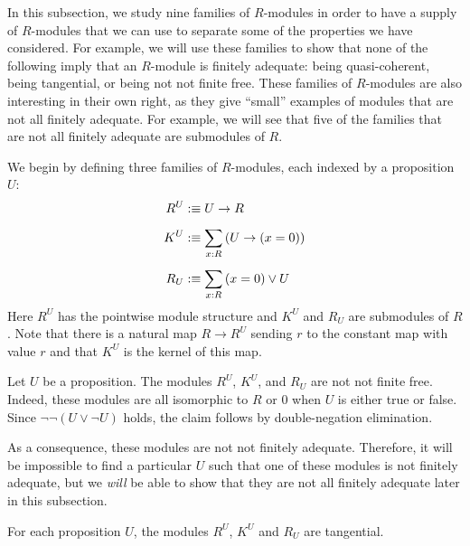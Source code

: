 In this subsection, we study nine families of $R$-modules in order to have a
supply of $R$-modules that we can use to separate some of the properties we have considered.
For example, we will use these families to show that none of the following imply that
an $R$-module is finitely adequate:
being quasi-coherent, being tangential, or being not not finite free.
These families of $R$-modules are also interesting in their own right,
as they give ``small'' examples of modules that are not all finitely adequate.
For example, we will see that five of the families that are not all
finitely adequate are submodules of $R$.

We begin by defining three families of $R$-modules, each indexed by a proposition $U$:
\begin{align*}
  R^U &:\equiv U \to R \\[5pt]
  K^U &:\equiv \sum_{x:R} \, (U \to (x = 0)) \\[5pt]
  R_U &:\equiv \sum_{x:R} \, (x = 0) \lor U
\end{align*}
Here $R^U$ has the pointwise module structure and $K^U$ and $R_U$ are submodules of $R$.
Note that there is a natural map $R \to R^U$ sending $r$ to the constant map with value $r$ and that $K^U$ is the kernel of this map.

\begin{remark}\label{rmk:strange-not-not-fin-free}
  Let $U$ be a proposition.
  The modules $R^U$, $K^U$, and $R_U$ are not not finite free.
  Indeed, these modules are all isomorphic to $R$ or $0$ when $U$ is either true or false.
  Since $\lnot\lnot(U \lor \lnot U)$ holds, the claim follows by double-negation elimination.
\end{remark}

As a consequence, these modules are not not finitely adequate.
Therefore, it will be impossible to find a particular $U$ such that one of
these modules is not finitely adequate, but we \emph{will} be able to show
that they are not all finitely adequate later in this subsection.

\begin{proposition}\label{prp:strange-tangential}
For each proposition $U$, the modules $R^U$, $K^U$ and $R_U$ are tangential.
\end{proposition}

